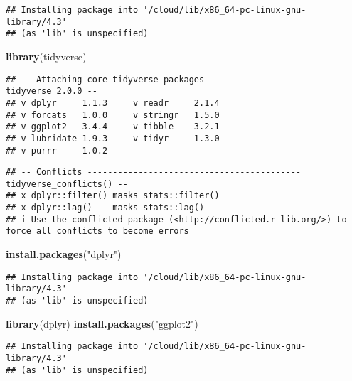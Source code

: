 \documentclass[
]{article}
\newenvironment{Shaded}{\begin{snugshade}}{\end{snugshade}}
\newcommand{\FunctionTok}[1]{\textcolor[rgb]{0.13,0.29,0.53}{\textbf{#1}}}
\newcommand{\NormalTok}[1]{#1}
\newcommand{\StringTok}[1]{\textcolor[rgb]{0.31,0.60,0.02}{#1}}
\begin{document}
\begin{verbatim}
## Installing package into '/cloud/lib/x86_64-pc-linux-gnu-library/4.3'
## (as 'lib' is unspecified)
\end{verbatim}

\begin{Shaded}
\begin{Highlighting}[]
\FunctionTok{library}\NormalTok{(tidyverse)}
\end{Highlighting}
\end{Shaded}

\begin{verbatim}
## -- Attaching core tidyverse packages ------------------------ tidyverse 2.0.0 --
## v dplyr     1.1.3     v readr     2.1.4
## v forcats   1.0.0     v stringr   1.5.0
## v ggplot2   3.4.4     v tibble    3.2.1
## v lubridate 1.9.3     v tidyr     1.3.0
## v purrr     1.0.2
\end{verbatim}

\begin{verbatim}
## -- Conflicts ------------------------------------------ tidyverse_conflicts() --
## x dplyr::filter() masks stats::filter()
## x dplyr::lag()    masks stats::lag()
## i Use the conflicted package (<http://conflicted.r-lib.org/>) to force all conflicts to become errors
\end{verbatim}

\begin{Shaded}
\begin{Highlighting}[]
\FunctionTok{install.packages}\NormalTok{(}\StringTok{"dplyr"}\NormalTok{)}
\end{Highlighting}
\end{Shaded}

\begin{verbatim}
## Installing package into '/cloud/lib/x86_64-pc-linux-gnu-library/4.3'
## (as 'lib' is unspecified)
\end{verbatim}

\begin{Shaded}
\begin{Highlighting}[]
\FunctionTok{library}\NormalTok{(dplyr)}
\FunctionTok{install.packages}\NormalTok{(}\StringTok{"ggplot2"}\NormalTok{)}
\end{Highlighting}
\end{Shaded}

\begin{verbatim}
## Installing package into '/cloud/lib/x86_64-pc-linux-gnu-library/4.3'
## (as 'lib' is unspecified)
\end{verbatim}
\end{document}
